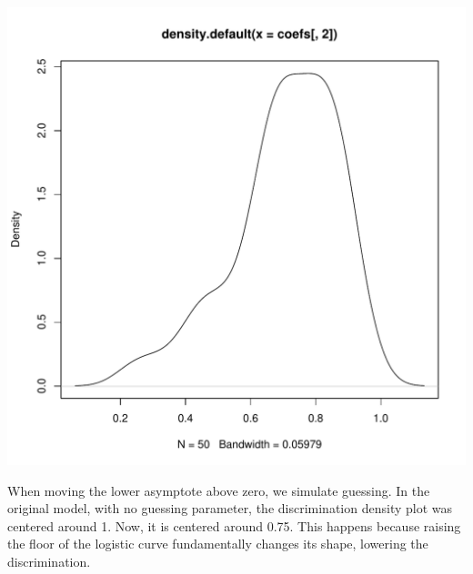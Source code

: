 \documentclass{article}\usepackage[]{graphicx}\usepackage[]{color}
\makeatletter
\def\maxwidth{ %
  \ifdim\Gin@nat@width>\linewidth
    \linewidth
  \else
    \Gin@nat@width
  \fi
}
\newenvironment{knitrout}{}{} %
\makeatother
\begin{document}
\begin{knitrout}
\color{fgcolor}
\includegraphics[width=\maxwidth]{figure/unnamed-chunk-13-1} 

\end{knitrout}

When moving the lower asymptote above zero, we simulate guessing.  In the original model, with no guessing parameter, the discrimination density plot was centered around 1.  Now, it is centered around 0.75.  This happens because raising the floor of the logistic curve fundamentally changes its shape, lowering the discrimination.
\end{document}
